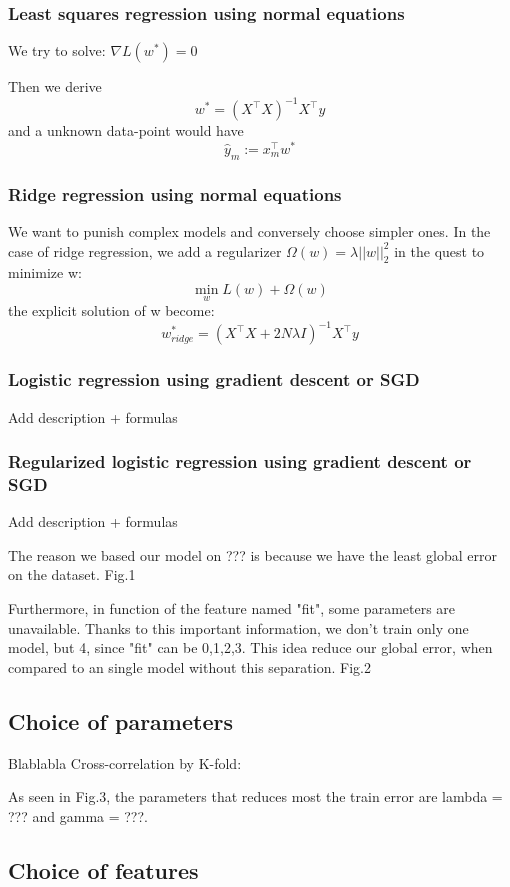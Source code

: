 \documentclass[10pt,conference,compsocconf]{IEEEtran}
\begin{document}
	
	\subsubsection{Least squares regression using normal equations}
	
	We try to solve: $\nabla L(w^*) = 0$
	
	Then we derive
	$$w^* = (X^\top X)^{-1}X^\top y$$
	and a unknown data-point would have 
	$$\hat y_m := x_m^\top w^*$$
	
	\subsubsection{Ridge regression using normal equations}
	
	We want to punish complex models and conversely choose simpler ones.
	In the case of ridge regression, we add a regularizer $\Omega(w) = \lambda||w||_2^2$ in the quest to minimize w:
	$$\min\limits_{w} L(w) + \Omega(w)$$
	the explicit solution of w become:
	$$w_{ridge}^* = (X^\top X+2N\lambda I)^{-1}X^\top y$$
	\subsubsection{Logistic regression using gradient descent or SGD}
	Add description + formulas
	\subsubsection{Regularized logistic regression using gradient descent or SGD}
	Add description + formulas
	
	
	The reason we based our model on ??? is because we have the least global error on the dataset. Fig.1 
	
	Furthermore, in function of the feature named "fit", some parameters are unavailable. Thanks to this important information, we don't train only one model, but 4, since "fit" can be {0,1,2,3}.
	This idea reduce our global error, when compared to an single model without this separation. Fig.2
	
	\subsection{Choice of parameters}
	Blablabla
	Cross-correlation by K-fold:
	
	As seen in Fig.3, the parameters that reduces most the train error are lambda = ??? and gamma = ???.
	
	\subsection{Choice of features}
	
\end{document}
